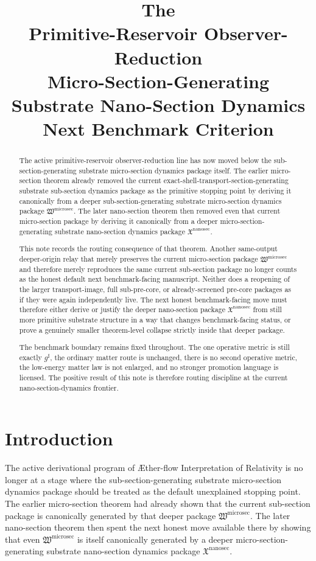 \documentclass[11pt]{article}
\title{\textbf{The \TheoryName{}}\\[0.4em]
\large Primitive-Reservoir Observer-Reduction\\
\large Micro-Section-Generating Substrate Nano-Section Dynamics\\
\large Next Benchmark Criterion}
\author{}
\date{}
\newcommand{\Aflow}{\AE{}ther-flow}
\newcommand{\TheoryName}{\Aflow{} Interpretation of Relativity}
\newcommand{\CompletedMetric}{g^{\sharp}}
\newcommand{\MicroSectionPackage}{\mathfrak W^{\mathrm{microsec}}}
\newcommand{\NanoSectionPackage}{\mathfrak X^{\mathrm{nanosec}}}
\begin{document}
\maketitle

\begin{abstract}
The active primitive-reservoir observer-reduction line has now moved below the sub-section-generating substrate micro-section dynamics package itself. The earlier micro-section theorem already removed the current exact-shell-transport-section-generating substrate sub-section dynamics package as the primitive stopping point by deriving it canonically from a deeper sub-section-generating substrate micro-section dynamics package \(\MicroSectionPackage\). The later nano-section theorem then removed even that current micro-section package by deriving it canonically from a deeper micro-section-generating substrate nano-section dynamics package \(\NanoSectionPackage\).

This note records the routing consequence of that theorem. Another same-output deeper-origin relay that merely preserves the current micro-section package \(\MicroSectionPackage\) and therefore merely reproduces the same current sub-section package no longer counts as the honest default next benchmark-facing manuscript. Neither does a reopening of the larger transport-image, full sub-pre-core, or already-screened pre-core packages as if they were again independently live. The next honest benchmark-facing move must therefore either derive or justify the deeper nano-section package \(\NanoSectionPackage\) from still more primitive substrate structure in a way that changes benchmark-facing status, or prove a genuinely smaller theorem-level collapse strictly inside that deeper package.

The benchmark boundary remains fixed throughout. The one operative metric is still exactly \(\CompletedMetric\), the ordinary matter route is unchanged, there is no second operative metric, the low-energy matter law is not enlarged, and no stronger promotion language is licensed. The positive result of this note is therefore routing discipline at the current nano-section-dynamics frontier.
\end{abstract}

\section{Introduction}

The active derivational program of \TheoryName{} is no longer at a stage where the sub-section-generating substrate micro-section dynamics package should be treated as the default unexplained stopping point. The earlier micro-section theorem had already shown that the current sub-section package is canonically generated by that deeper package \(\MicroSectionPackage\). The later nano-section theorem then spent the next honest move available there by showing that even \(\MicroSectionPackage\) is itself canonically generated by a deeper micro-section-generating substrate nano-section dynamics package \(\NanoSectionPackage\).
\end{document}
